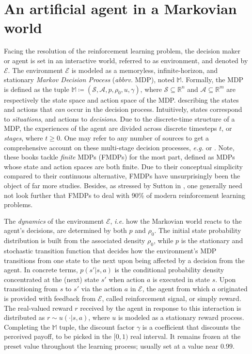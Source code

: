 \section{An artificial agent in a Markovian world}

Facing the resolution of the reinforcement learning problem,
the decision maker or agent is set in an interactive world,
referred to as environment, and denoted by $\mathcal{E}$.
The environment $\mathcal{E}$ is modeled as a memoryless, infinite-horizon, and stationary
\emph{Markov Decision Process} (\textit{abbrv.} MDP), noted $\mathbb{M}$.
Formally, the MDP is defined as the tuple
$\mathbb{M} \coloneqq (\mathcal{S}, \mathcal{A}, p, \rho_0, u, \gamma)$, where
$\mathcal{S} \subseteq \mathbb{R}^n$ and $\mathcal{A} \subseteq \mathbb{R}^m$
are respectively the state space and action space of the MDP.
describing the states and actions that \textit{can} occur in the decision process.
Intuitively, states correspond to \emph{situations}, and actions to \emph{decisions}.
Due to the discrete-time structure of a MDP,
the experiences of the agent are divided across discrete timesteps $t$, or \emph{stages}, where $t\geq0$.
One may refer to any number of sources to get a comprehensive account on these multi-stage decision processes,
\textit{e.g.} \cite{Ross1983-oc} or \cite{Puterman1994-pf}.
Note, these books tackle \textit{finite} MDPs (FMDPs) for the most part,
defined as MDPs whose state and action spaces are both finite.
Due to their conceptual simplicity compared to their continuous alternative, FMDPs
have unsurprisingly been the object of far more studies.
Besides, as stressed by Sutton in \cite{Sutton1998-ow},
one generally need not look further that FMDPs
to deal with 90\% of modern reinforcement learning problems.

The \emph{dynamics} of the environment $\mathcal{E}$,
\textit{i.e.} how the Markovian world reacts to the agent's decisions,
are determined by both $p$ and $\rho_0$.
The initial state probability distribution is built from the associated density $\rho_0$, while
$p$ is the stationary and stochastic transition function that decides how the environment's MDP transitions from
one state to the next upon being affected by a decision from the agent.
In concrete terms, $p(s' | s, a)$ is the conditional probability density
concentrated at the (next) state $s'$ when action $a$ is executed in state $s$.
Upon transitioning from $s$ to $s'$ via the action $a$ in $\mathcal{E}$,
the agent from which $a$ originated is provided with feedback from $\mathcal{E}$,
called reinforcement signal, or simply reward.
The real-valued reward $r$ received by the agent in response to this interaction
is distributed as $r \sim u(\cdot | s, a)$, where $u$ is modeled as a stationary reward process.
Completing the $\mathbb{M}$ tuple,
the discount factor $\gamma$ is a coefficient that discounts the perceived payoff,
to be picked in the $[0, 1)$ real interval.
It remains frozen at the preset value throughout the learning process;
usually set at a value near $0.99$.

